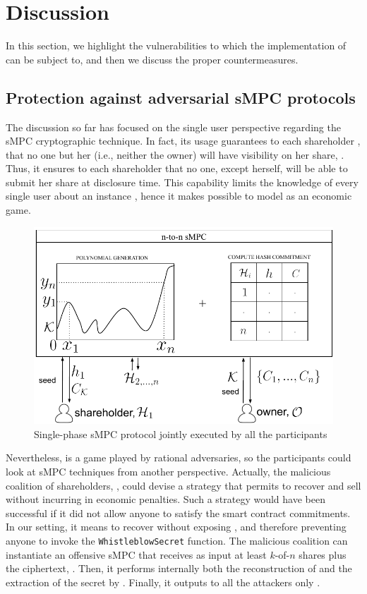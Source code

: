 \section{Discussion}\label{sect:impl_attacks}

In this section, we highlight the vulnerabilities to which the implementation of \shortname can be subject to, and then we discuss the proper countermeasures.  

\subsection{Protection against adversarial sMPC protocols}\label{sect:impl_mpc}

The discussion so far has focused on the single user perspective regarding the sMPC cryptographic technique.
In fact, its usage guarantees to each shareholder \shareholder, that no one but her (i.e., neither the owner) will have visibility on her share, \share.
Thus, it ensures to each shareholder that no one, except herself, will be able to submit her share at disclosure time. 
This capability limits the knowledge of every single user about an instance \shortname, hence it makes possible to model \shortname as an economic game. 

\begin{figure}[t]
	\centering
	\includegraphics[width=0.9\columnwidth]{fig/mpc_rev_1.pdf}
	\caption{Single-phase sMPC protocol jointly executed by all the participants}
	\label{fig:mpc1}
\end{figure}

Nevertheless, \shortname is a game played by rational adversaries, so the participants could look at sMPC techniques from another perspective.
Actually, the malicious coalition of shareholders, \coalition, could devise a strategy that permits to recover and sell \secret without incurring in economic penalties. 
Such a strategy would have been successful if it did not allow anyone to satisfy the smart contract commitments.
In our setting, it means to recover \secret without exposing \key, and therefore preventing anyone to invoke the \texttt{WhistleblowSecret} function.
The malicious coalition can instantiate an offensive sMPC that receives as input at least $k$-of-$n$ shares plus the ciphertext, \ciphertext.
Then, it performs internally both the reconstruction of \key and the extraction of the secret by \unwrap.
Finally, it outputs to all the attackers only \secret. 

